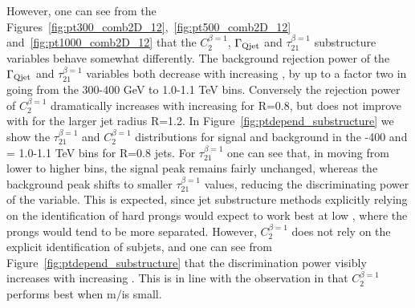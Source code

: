 However, one can see from the Figures~\ref{fig:pt300_comb2D_12},~\ref{fig:pt500_comb2D_12}
and~\ref{fig:pt1000_comb2D_12} that the $C_2^{\beta=1}$, $\Gamma_{\rm Qjet}$ and
$\tau_{21}^{\beta=1}$ substructure variables behave somewhat
differently. The background rejection power of the $\Gamma_{\rm Qjet}$ and
$\tau_{21}^{\beta=1}$ variables both decrease with increasing \pT, by
up to a factor two in going from the 300-400 GeV to
1.0-1.1 TeV bins. Conversely the rejection power of $C_2^{\beta=1}$
dramatically increases with increasing \pT for R=0.8, but does not
improve with \pT for the larger jet radius R=1.2. In Figure~\ref{fig:ptdepend_substructure} we show the
$\tau_{21}^{\beta=1}$ and $C_2^{\beta=1}$ distributions for signal and background in the -400 and \pT = 1.0-1.1 TeV bins for R=0.8 jets. For
$\tau_{21}^{\beta=1}$ one can see that, in moving from  lower to 
higher \pT bins, the signal peak remains fairly unchanged, whereas the
background peak shifts to smaller $\tau_{21}^{\beta=1}$ values,
reducing the discriminating power of the variable. This is expected,
since jet substructure methods explicitly relying on the identification of hard
prongs would expect to work best at low \pT, where the prongs would
tend to be more separated. However, $C_2^{\beta=1}$ does not rely on
the explicit identification of subjets, and one can see from
Figure~\ref{fig:ptdepend_substructure} that the discrimination power
visibly increases with increasing \pT. This is in line with the
observation in \cite{Larkoski:2013eya} that $C_2^{\beta=1}$ performs best when m/\pT is small.

